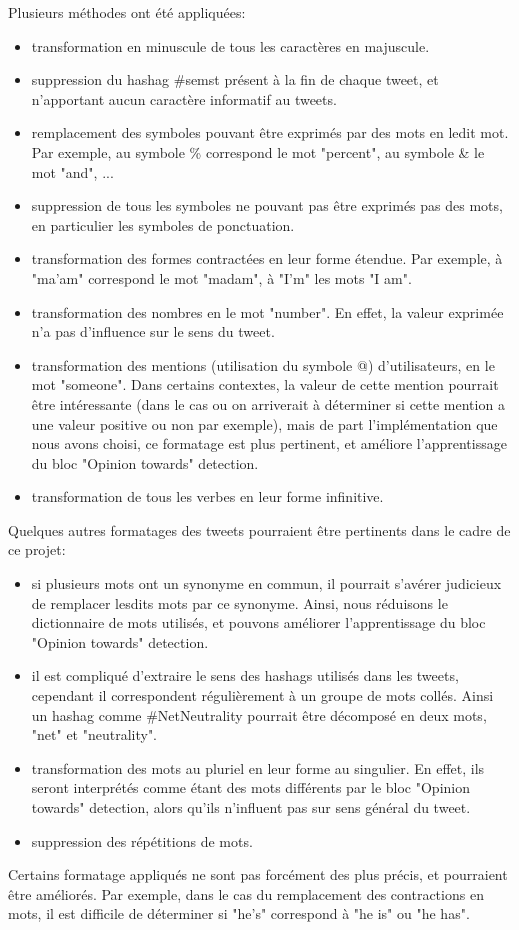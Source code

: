 \par Plusieurs méthodes ont été appliquées:
\begin{itemize}
  \item transformation en minuscule de tous les caractères en majuscule.
  \item suppression du hashag \#semst présent à la fin de chaque tweet, et n'apportant aucun caractère informatif au tweets.
  \item remplacement des symboles pouvant être exprimés par des mots en ledit mot. Par exemple, au symbole \% correspond le mot "percent", au symbole \& le mot "and", ...
  \item suppression de tous les symboles ne pouvant pas être exprimés pas des mots, en particulier les symboles de ponctuation.
  \item transformation des formes contractées en leur forme étendue. Par exemple, à "ma'am" correspond le mot "madam", à "I'm" les mots "I am".
  \item transformation des nombres en le mot "number". En effet, la valeur exprimée n'a pas d'influence sur le sens du tweet.
  \item transformation des mentions (utilisation du symbole @) d'utilisateurs, en le mot "someone". Dans certains contextes, la valeur de cette mention pourrait être intéressante (dans le cas ou on arriverait à déterminer si cette mention a une valeur positive ou non par exemple), mais de part l'implémentation que nous avons choisi, ce formatage est plus pertinent, et améliore l'apprentissage du bloc "Opinion towards" detection.
  \item transformation de tous les verbes en leur forme infinitive.
\end{itemize}

\par Quelques autres formatages des tweets pourraient être pertinents dans le cadre de ce projet:
\begin{itemize}
  \item si plusieurs mots ont un synonyme en commun, il pourrait s'avérer judicieux de remplacer lesdits mots par ce synonyme. Ainsi, nous réduisons le dictionnaire de mots utilisés, et pouvons améliorer l'apprentissage du bloc "Opinion towards" detection.
  \item il est compliqué d'extraire le sens des hashags utilisés dans les tweets, cependant il correspondent régulièrement à un groupe de mots collés. Ainsi un hashag comme \#NetNeutrality pourrait être décomposé en deux mots, "net" et "neutrality".
  \item transformation des mots au pluriel en leur forme au singulier. En effet, ils seront interprétés comme étant des mots différents par le bloc "Opinion towards" detection, alors qu'ils n'influent pas sur sens général du tweet.
  \item suppression des répétitions de mots.
\end{itemize}
Certains formatage appliqués ne sont pas forcément des plus précis, et pourraient être améliorés. Par exemple, dans le cas du remplacement des contractions en mots, il est difficile de déterminer si "he's" correspond à "he is" ou "he has".

